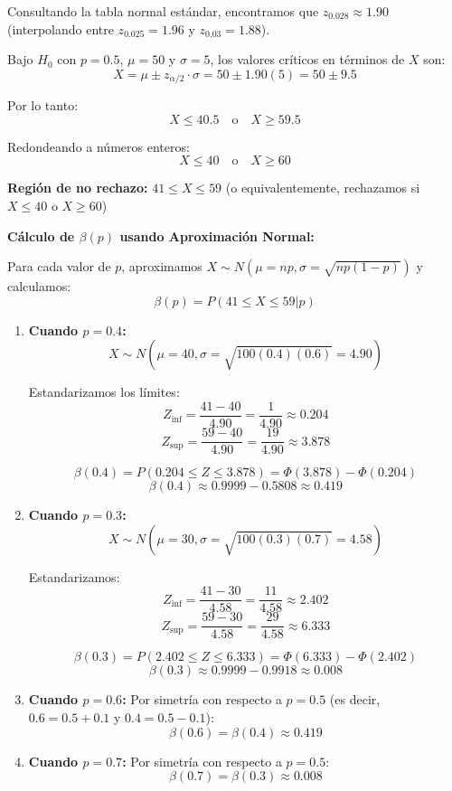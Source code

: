 \documentclass[12pt]{article}
\begin{document}
Consultando la tabla normal estándar, encontramos que $z_{0.028} \approx 1.90$ (interpolando entre $z_{0.025} = 1.96$ y $z_{0.03} = 1.88$).

Bajo $H_0$ con $p = 0.5$, $\mu = 50$ y $\sigma = 5$, los valores críticos en términos de $X$ son:
$$X = \mu \pm z_{\alpha/2} \cdot \sigma = 50 \pm 1.90(5) = 50 \pm 9.5$$

Por lo tanto:
$$X \leq 40.5 \quad \text{o} \quad X \geq 59.5$$

Redondeando a números enteros:
$$X \leq 40 \quad \text{o} \quad X \geq 60$$

\textbf{Región de no rechazo:} $41 \leq X \leq 59$ (o equivalentemente, rechazamos si $X \leq 40$ o $X \geq 60$)

\textbf{Cálculo de $\beta(p)$ usando Aproximación Normal:}

Para cada valor de $p$, aproximamos $X \sim N(\mu = np, \sigma = \sqrt{np(1-p)})$ y calculamos:
$$\beta(p) = P(41 \leq X \leq 59 | p)$$

\begin{enumerate}
    \item \textbf{Cuando $p = 0.4$:}
    $$X \sim N(\mu = 40, \sigma = \sqrt{100(0.4)(0.6)} = 4.90)$$
    
    Estandarizamos los límites:
    $$Z_{\text{inf}} = \frac{41 - 40}{4.90} = \frac{1}{4.90} \approx 0.204$$
    $$Z_{\text{sup}} = \frac{59 - 40}{4.90} = \frac{19}{4.90} \approx 3.878$$
    
    $$\beta(0.4) = P(0.204 \leq Z \leq 3.878) = \Phi(3.878) - \Phi(0.204)$$
    $$\beta(0.4) \approx 0.9999 - 0.5808 \approx 0.419$$
    
    \item \textbf{Cuando $p = 0.3$:}
    $$X \sim N(\mu = 30, \sigma = \sqrt{100(0.3)(0.7)} = 4.58)$$
    
    Estandarizamos:
    $$Z_{\text{inf}} = \frac{41 - 30}{4.58} = \frac{11}{4.58} \approx 2.402$$
    $$Z_{\text{sup}} = \frac{59 - 30}{4.58} = \frac{29}{4.58} \approx 6.333$$
    
    $$\beta(0.3) = P(2.402 \leq Z \leq 6.333) = \Phi(6.333) - \Phi(2.402)$$
    $$\beta(0.3) \approx 0.9999 - 0.9918 \approx 0.008$$
    
    \item \textbf{Cuando $p = 0.6$:}
    Por simetría con respecto a $p = 0.5$ (es decir, $0.6 = 0.5 + 0.1$ y $0.4 = 0.5 - 0.1$):
    $$\beta(0.6) = \beta(0.4) \approx 0.419$$
    
    \item \textbf{Cuando $p = 0.7$:}
    Por simetría con respecto a $p = 0.5$:
    $$\beta(0.7) = \beta(0.3) \approx 0.008$$
\end{enumerate}
\end{document}
